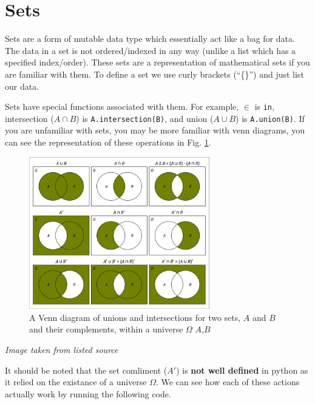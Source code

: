 \documentclass[12pt,a4paper]{book}
\newcommand{\source}[1]{\caption*{Source: {#1}} }
\newcommand{\figref}[1]{Fig. \ref{#1}}
\begin{document}
		\section{Sets}
			Sets are a form of mutable data type which essentially act like a bag for data. The data in a set is not ordered/indexed in any way (unlike a list which has a specified index/order). These sets are a representation of mathematical sets if you are familiar with them. To define a set we use curly brackets (``\{\}'') and just list our data.
			

			Sets have special functions associated with them. For example, $\in$ is \texttt{in}, intersection ($A\cap B$) is \texttt{A.intersection(B)}, and union ($A\cup B$) is \texttt{A.union(B)}. If you are unfamiliar with sets, you may be more familiar with venn diagrams, you can see the representation of these operations in \figref{fig:chap5-sets-1}.

			\begin{figure}[H]
				\centering
				\includegraphics[width=0.7\textwidth]{figures/chapter_5/sets.png}
				\caption{A Venn diagram of unions and intersections for two sets, $A$ and $B$ and their complements, within a universe $\Omega$ $A$,$B$}
				\label{fig:chap5-sets-1}
			\end{figure}
			\textit{Image taken from listed source\autocite{chap_5_set_figure_1}} 
			
			It should be noted that the set comliment ($A'$) is \textbf{not well defined} in python as it relied on the existance of a universe $\Omega$. We can see how each of these actions actually work by running the following code.
\end{document}
